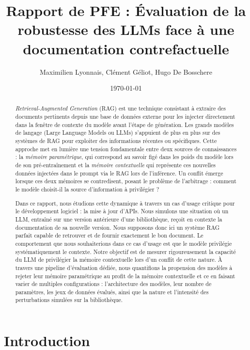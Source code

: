 \documentclass[11pt, a4paper]{article}
\title{\textbf{Rapport de PFE : Évaluation de la robustesse des LLMs face à une documentation contrefactuelle}}
\author{Maximilien Lyonnais, Clément Géliot, Hugo De Bosschere}
\date{\today}
\begin{document}
\shorthandoff{:}
\maketitle

\begin{abstract}
\textit{Retrieval-Augmented Generation} (RAG) est une technique consistant à extraire des documents pertinents depuis une base de données externe pour les injecter directement dans la fenêtre de contexte du modèle avant l'étape de génération. Les grands modèles de langage (Large Language Models ou LLMs) s'appuient de plus en plus sur des systèmes de RAG pour exploiter des informations récentes ou spécifiques. Cette approche met en lumière une tension fondamentale entre deux sources de connaissances : la \textit{mémoire paramétrique}, qui correspond au savoir figé dans les poids du modèle lors de son pré-entraînement et la \textit{mémoire contextuelle} qui représente ces nouvelles données injectées dans le prompt via le RAG lors de l'inférence. Un conflit émerge lorsque ces deux mémoires se contredisent, posant le problème de l'arbitrage : comment le modèle choisit-il la source d'information à privilégier ? 

Dans ce rapport, nous étudions cette dynamique à travers un cas d'usage critique pour le développement logiciel : la mise à jour d'APIs. Nous simulons une situation où un LLM, entraîné sur une version antérieure d'une bibliothèque, reçoit en contexte la documentation de sa nouvelle version. Nous supposons donc ici un système RAG parfait capable de retrouver et de fournir exactement le bon document. Le comportement que nous souhaiterions dans ce cas d'usage est que le modèle privilégie systématiquement le contexte. Notre objectif est de mesurer rigoureusement la capacité du LLM de privilégier la mémoire contextuelle lors d'un conflit de cette nature. À travers une pipeline d'évaluation dédiée, nous quantifions la propension des modèles à rejeter leur mémoire paramétrique au profit de la mémoire contextuelle et ce en faisant varier de multiples configurations : l'architecture des modèles, leur nombre de paramètres, les jeux de données évalués, ainsi que la nature et l'intensité des perturbations simulées sur la bibliothèque.
\end{abstract}

\tableofcontents
\newpage

\section{Introduction}
\end{document}
